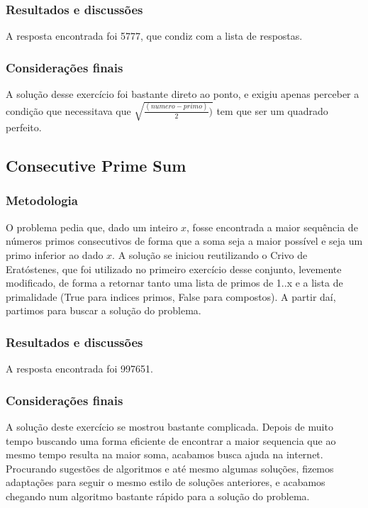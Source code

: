 \documentclass{article}
\begin{document}
        \subsubsection{Resultados e discussões}
        A resposta encontrada foi 5777, que condiz com a lista de respostas.
        
        \subsubsection{Considerações finais}
        A solução desse exercício foi bastante direto ao ponto, e exigiu apenas perceber a condição que necessitava que $\sqrt{\frac{(numero - primo)}{2})}$ tem que ser um quadrado perfeito.
        
    \subsection{Consecutive Prime Sum}
        
        \subsubsection{Metodologia}
        O problema pedia que, dado um inteiro $x$, fosse encontrada a maior sequência de números primos consecutivos de forma que a soma seja a maior possível e seja um primo inferior ao dado $x$.
        A solução se iniciou reutilizando o Crivo de Eratóstenes, que foi utilizado no primeiro exercício desse conjunto, levemente modificado, de forma a retornar tanto uma lista de primos de 1..x e a lista de primalidade (True para indices primos, False para compostos).
        A partir daí, partimos para buscar a solução do problema.
        
        \subsubsection{Resultados e discussões}
        A resposta encontrada foi 997651.
        
        \subsubsection{Considerações finais}
        A solução deste exercício se mostrou bastante complicada. Depois de muito tempo buscando uma forma eficiente de encontrar a maior sequencia que ao mesmo tempo resulta na maior soma, acabamos busca ajuda na internet.
        Procurando sugestões de algoritmos e até mesmo algumas soluções, fizemos adaptações para seguir o mesmo estilo de soluções anteriores, e acabamos chegando num algoritmo bastante rápido para a solução do problema.
\end{document}
